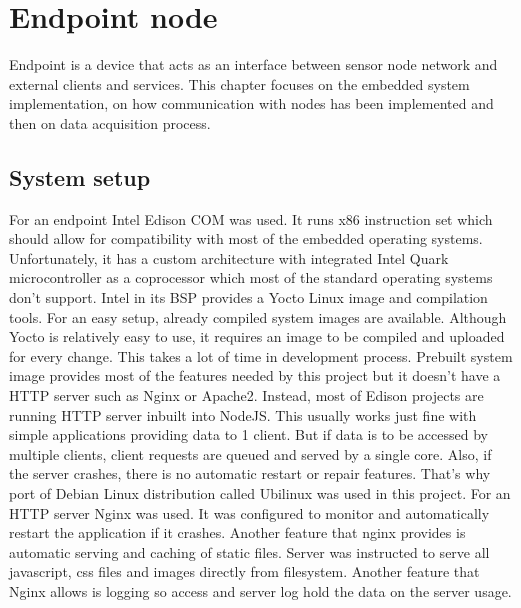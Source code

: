 \chapter{Endpoint node}
\label{chap:endpoint}

Endpoint is a device that acts as an interface between sensor node network and external clients and services. This chapter focuses on the embedded system implementation, on how communication with nodes has been implemented and then on data acquisition process.


\section{System setup}

For an endpoint Intel Edison \ac{COM} was used. It runs x86 instruction set\cite{Edison} which should allow for compatibility with most of the embedded operating systems. Unfortunately, it has a custom architecture with integrated Intel Quark microcontroller as a coprocessor which most of the standard operating systems don't support. Intel in its \ac{BSP} provides a Yocto Linux image and compilation tools. For an easy setup, already compiled system images are available. Although Yocto is relatively easy to use, it requires an image to be compiled and uploaded for every change. This takes a lot of time in development process. Prebuilt system image provides most of the features needed by this project but it doesn't have a \ac{HTTP} server such as Nginx or Apache2. Instead, most of Edison projects are running \ac{HTTP} server inbuilt into NodeJS. This usually works just fine with simple applications providing data to 1 client. But if data is to be accessed by multiple clients, client requests are queued and served by a single core. Also, if the server crashes, there is no automatic restart or repair features. That's why port of Debian Linux distribution called Ubilinux was used in this project. For an \ac{HTTP} server Nginx was used. It was configured to monitor and automatically restart the application if it crashes. Another feature that nginx provides is automatic serving and caching of static files. Server was instructed to serve all javascript, css files and images directly from filesystem. Another feature that Nginx allows is logging so access and server log hold the data on the server usage. 

